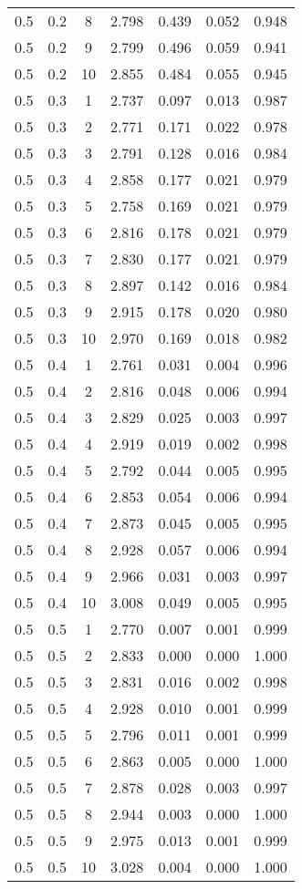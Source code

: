 \begin{tabular}{|c|c|c|c|c|c|c|}
0.5 & 0.2 & 8 & 2.798 & 0.439 & 0.052 & 0.948 \\
0.5 & 0.2 & 9 & 2.799 & 0.496 & 0.059 & 0.941 \\
0.5 & 0.2 & 10 & 2.855 & 0.484 & 0.055 & 0.945 \\
0.5 & 0.3 & 1 & 2.737 & 0.097 & 0.013 & 0.987 \\
0.5 & 0.3 & 2 & 2.771 & 0.171 & 0.022 & 0.978 \\
0.5 & 0.3 & 3 & 2.791 & 0.128 & 0.016 & 0.984 \\
0.5 & 0.3 & 4 & 2.858 & 0.177 & 0.021 & 0.979 \\
0.5 & 0.3 & 5 & 2.758 & 0.169 & 0.021 & 0.979 \\
0.5 & 0.3 & 6 & 2.816 & 0.178 & 0.021 & 0.979 \\
0.5 & 0.3 & 7 & 2.830 & 0.177 & 0.021 & 0.979 \\
0.5 & 0.3 & 8 & 2.897 & 0.142 & 0.016 & 0.984 \\
0.5 & 0.3 & 9 & 2.915 & 0.178 & 0.020 & 0.980 \\
0.5 & 0.3 & 10 & 2.970 & 0.169 & 0.018 & 0.982 \\
0.5 & 0.4 & 1 & 2.761 & 0.031 & 0.004 & 0.996 \\
0.5 & 0.4 & 2 & 2.816 & 0.048 & 0.006 & 0.994 \\
0.5 & 0.4 & 3 & 2.829 & 0.025 & 0.003 & 0.997 \\
0.5 & 0.4 & 4 & 2.919 & 0.019 & 0.002 & 0.998 \\
0.5 & 0.4 & 5 & 2.792 & 0.044 & 0.005 & 0.995 \\
0.5 & 0.4 & 6 & 2.853 & 0.054 & 0.006 & 0.994 \\
0.5 & 0.4 & 7 & 2.873 & 0.045 & 0.005 & 0.995 \\
0.5 & 0.4 & 8 & 2.928 & 0.057 & 0.006 & 0.994 \\
0.5 & 0.4 & 9 & 2.966 & 0.031 & 0.003 & 0.997 \\
0.5 & 0.4 & 10 & 3.008 & 0.049 & 0.005 & 0.995 \\
0.5 & 0.5 & 1 & 2.770 & 0.007 & 0.001 & 0.999 \\
0.5 & 0.5 & 2 & 2.833 & 0.000 & 0.000 & 1.000 \\
0.5 & 0.5 & 3 & 2.831 & 0.016 & 0.002 & 0.998 \\
0.5 & 0.5 & 4 & 2.928 & 0.010 & 0.001 & 0.999 \\
0.5 & 0.5 & 5 & 2.796 & 0.011 & 0.001 & 0.999 \\
0.5 & 0.5 & 6 & 2.863 & 0.005 & 0.000 & 1.000 \\
0.5 & 0.5 & 7 & 2.878 & 0.028 & 0.003 & 0.997 \\
0.5 & 0.5 & 8 & 2.944 & 0.003 & 0.000 & 1.000 \\
0.5 & 0.5 & 9 & 2.975 & 0.013 & 0.001 & 0.999 \\
0.5 & 0.5 & 10 & 3.028 & 0.004 & 0.000 & 1.000 \\
\hline
\end{tabular}
